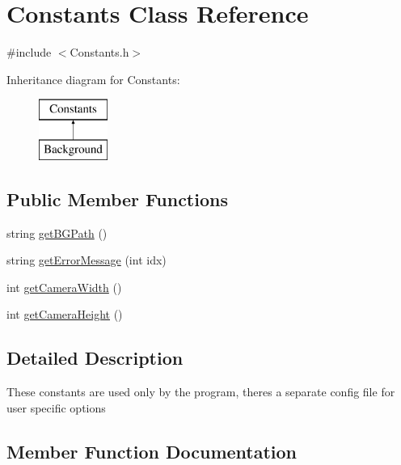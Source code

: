 \hypertarget{classConstants}{}\section{Constants Class Reference}
\label{classConstants}


{\ttfamily \#include $<$Constants.\+h$>$}

Inheritance diagram for Constants\+:\begin{figure}[H]
\begin{center}
\leavevmode
\includegraphics[height=2.000000cm]{classConstants}
\end{center}
\end{figure}
\subsection*{Public Member Functions}
\begin{DoxyCompactItemize}
\item 
string \hyperlink{classConstants_a192570c7395cc199c295be25c851ab59}{get\+B\+G\+Path} ()
\item 
string \hyperlink{classConstants_a2017e0f60d08822215e0876e50e7a671}{get\+Error\+Message} (int idx)
\item 
int \hyperlink{classConstants_a99ee472396cb27f43e1c17541e9cd071}{get\+Camera\+Width} ()
\item 
int \hyperlink{classConstants_a04a1764de8928d2fca5cf2555735a405}{get\+Camera\+Height} ()
\end{DoxyCompactItemize}


\subsection{Detailed Description}
These constants are used only by the program, there\textquotesingle{}s a separate config file for user specific options 

\subsection{Member Function Documentation}
\mbox{\label{classConstants_a192570c7395cc199c295be25c851ab59}} 

